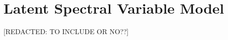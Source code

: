 \section{Latent Spectral Variable Model}
\label{sec:chap10-lsvm}

[REDACTED: TO INCLUDE OR NO??]

%
%
%
%
%
%
%
%
